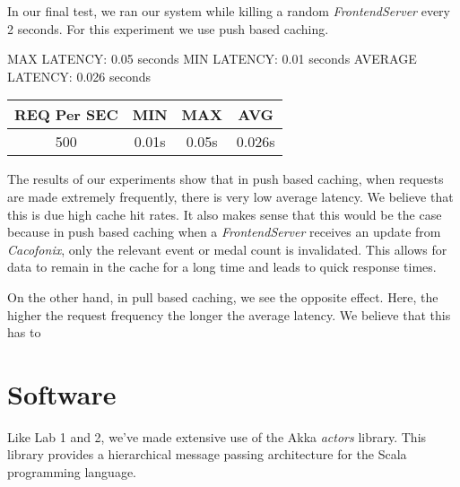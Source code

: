\documentclass[11pt]{article}
\begin{document}
In our final test, we ran our system while killing a random
\emph{FrontendServer} every 2 seconds.  For this experiment we use
push based caching.

MAX LATENCY: 0.05 seconds
MIN LATENCY: 0.01 seconds
AVERAGE LATENCY: 0.026 seconds

\begin{tabular}{c|c|c|c}
  REQ Per SEC & MIN & MAX & AVG \\
  \hline
  500  & 0.01s  & 0.05s & 0.026s \\
\end{tabular}

The results of our experiments show that in push based caching, when
requests are made extremely frequently, there is very low average
latency.  We believe that this is due high cache hit rates.  It also
makes sense that this would be the case because in push based caching
when a \emph{FrontendServer} receives an update from \emph{Cacofonix},
only the relevant event or medal count is invalidated.  This allows
for data to remain in the cache for a long time and leads to quick
response times.

On the other hand, in pull based caching, we see the opposite
effect. Here, the higher the request frequency the longer the average
latency.  We believe that this has to



\section{Software}
Like Lab 1 and 2, we've made extensive use of the Akka \emph{actors}
library.  This library provides a hierarchical message passing
architecture for the Scala programming language.
\end{document}
